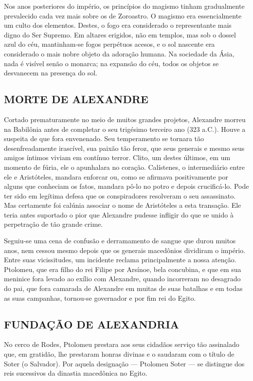 \documentclass[11pt,a5paper,twoside,openany]{book}
\begin{document}
Nos anos posteriores do império, os princípios do magismo tinham gradualmente prevalecido cada vez mais sobre os de Zoroastro. O magismo era essencialmente um culto dos elementos. Destes, o fogo era considerado o representante mais digno do Ser Supremo. Em altares erigidos, não em templos, mas sob o dossel azul do céu, mantinham-se fogos perpétuos acesos, e o sol nascente era considerado o mais nobre objeto da adoração humana. Na sociedade da Ásia, nada é visível senão o monarca; na expansão do céu, todos os objetos se desvanecem na presença do sol.

\subsection*{MORTE DE ALEXANDRE}
Cortado prematuramente no meio de muitos grandes projetos, Alexandre morreu na Babilônia antes de completar o seu trigésimo terceiro ano (323 a.C.). Houve a suspeita de que fora envenenado. Seu temperamento se tornara tão desenfreadamente irascível, sua paixão tão feroz, que seus generais e mesmo seus amigos íntimos viviam em contínuo terror. Clito, um destes últimos, em um momento de fúria, ele o apunhalara no coração. Calístenes, o intermediário entre ele e Aristóteles, mandara enforcar ou, como se afirmava positivamente por alguns que conheciam os fatos, mandara pô-lo no potro e depois crucificá-lo. Pode ter sido em legítima defesa que os conspiradores resolveram o seu assassinato. Mas certamente foi calúnia associar o nome de Aristóteles a esta transação. Ele teria antes suportado o pior que Alexandre pudesse infligir do que se unido à perpetração de tão grande crime.

Seguiu-se uma cena de confusão e derramamento de sangue que durou muitos anos, nem cessou mesmo depois que os generais macedônios dividiram o império. Entre suas vicissitudes, um incidente reclama principalmente a nossa atenção. Ptolomeu, que era filho do rei Filipe por Arsínoe, bela concubina, e que em sua meninice fora levado ao exílio com Alexandre, quando incorreram no desagrado do pai, que fora camarada de Alexandre em muitas de suas batalhas e em todas as suas campanhas, tornou-se governador e por fim rei do Egito.

\subsection*{FUNDAÇÃO DE ALEXANDRIA}
No cerco de Rodes, Ptolomeu prestara aos seus cidadãos serviço tão assinalado que, em gratidão, lhe prestaram honras divinas e o saudaram com o título de Soter (o Salvador). Por aquela designação — Ptolomeu Soter — se distingue dos reis sucessivos da dinastia macedônica no Egito.
\end{document}
